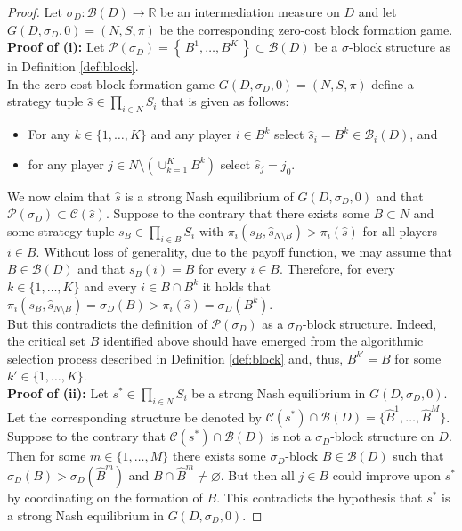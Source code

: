 \begin{proof}
Let $\sigma_D \colon \mathcal{B} (D) \to \mathbb{R}$ be an intermediation measure on $D$ and let $G (D, \sigma_D ,0) = (N,S, \pi )$ be the corresponding zero-cost block formation game.
\\[1ex]
\textbf{Proof of (i):}
Let $\mathcal{P} (\sigma_D) = \left\{ \, B^1, \ldots ,B^K \, \right\} \subset \mathcal{B} (D)$ be a $\sigma$-block structure as in Definition \ref{def:block}.
\\
In the zero-cost block formation game $G (D, \sigma_D ,0) = (N,S, \pi )$ define a strategy tuple $\hat{s} \in \prod_{i \in N} S_i$ that is given as follows:
\begin{itemize}
\item For any $k \in \{ 1, \ldots ,K \}$ and any player $i \in B^k$ select $\hat{s}_i = B^k \in \mathcal{B}_i (D)$, and

\item for any player $j \in N \setminus \left( \cup_{k=1}^K B^k \right)$ select $\hat{s}_j = j_0$.
\end{itemize}
We now claim that $\hat{s}$ is a strong Nash equilibrium of $G (D, \sigma_D ,0)$ and that $\mathcal{P} (\sigma_D) \subset \mathcal{C} (\hat{s})$. Suppose to the contrary that there exists some $B \subset N$ and some strategy tuple $s_B \in \prod_{i \in B} S_i$ with $\pi_i (s_B, \hat{s}_{N \setminus B}) > \pi_i (\hat{s})$ for all players $i \in B$. Without loss of generality, due to the payoff function, we may assume that $B \in \mathcal{B} (D)$ and that $s_B (i) = B$ for every $i \in B$. Therefore, for every $k \in \{ 1, \ldots ,K \}$ and every $i \in B \cap B^k$ it holds that $\pi_i (s_B , \hat{s}_{N \setminus B}) = \sigma_D (B) > \pi_i (\hat{s}) = \sigma_D (B^k)$.
\\
But this contradicts the definition of $\mathcal{P} (\sigma_D)$ as a $\sigma_D$-block structure. Indeed, the critical set $B$ identified above should have emerged from the algorithmic selection process described in Definition \ref{def:block} and, thus, $B^{k'} =B$ for some $k' \in \{ 1, \ldots ,K \}$.
\\[1ex]
\textbf{Proof of (ii):}
Let $s^* \in \prod_{i \in N} S_i$ be a strong Nash equilibrium in $G (D, \sigma_D ,0)$. Let the corresponding structure be denoted by $\mathcal{C} (s^*) \cap \mathcal{B} (D) = \{ \widehat{B}^1, \ldots , \widehat{B}^M \}$.
\\
Suppose to the contrary that $\mathcal{C} (s^*) \cap \mathcal{B} (D)$ is not a $\sigma_D$-block structure on $D$. Then for some $m \in \{ 1, \ldots ,M \}$ there exists some $\sigma_D$-block $B \in \mathcal{B} (D)$ such that $\sigma_D (B) > \sigma_D (\widehat{B}^m)$ and $B \cap \widehat{B}^m \neq \varnothing$. But then all $j \in B$ could improve upon $s^*$ by coordinating on the formation of $B$. This contradicts the hypothesis that $s^*$ is a strong Nash equilibrium in $G (D, \sigma_D ,0)$.
\end{proof}

